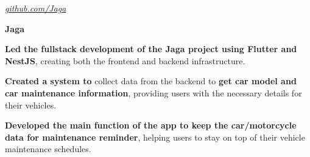 \documentclass[../main.tex]{subfiles}
\begin{document}
        \vspace{0.2 cm}

        \begin{twocolentry}{
           \small 
            
        \textit{\href{https://github.com/cattyman919/Jaga}{github.com/Jaga}}}
            \textbf{Jaga}
        \end{twocolentry}

        \vspace{0.10 cm}
        \begin{onecolentry}
            \begin{highlights}
            \item \textbf{Led the fullstack development of the Jaga project using Flutter and NestJS}, creating both the frontend and backend infrastructure.
            \item \textbf{Created a system to} collect data from the backend to \textbf{get car model and car maintenance information}, providing users with the necessary details for their vehicles.
            \item \textbf{Developed the main function of the app to keep the car/motorcycle data for maintenance reminder}, helping users to stay on top of their vehicle maintenance schedules.
            \end{highlights}
        \end{onecolentry}
\end{document}

